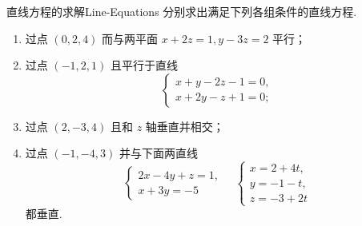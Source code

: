 \begin{problem}{直线方程的求解}{Line-Equations}
    分别求出满足下列各组条件的直线方程.
    \begin{enumerate}
        \item 过点 $(0, 2, 4)$ 而与两平面 $x + 2z = 1, y - 3z = 2$ 平行；
        \item 过点 $(-1, 2, 1)$ 且平行于直线
              \begin{equation*}
                  \begin{cases}
                      x + y - 2z - 1 = 0, \\
                      x + 2y - z + 1 = 0;
                  \end{cases}
              \end{equation*}
        \item 过点 $(2, -3, 4)$ 且和 $z$ 轴垂直并相交；
        \item 过点 $(-1, -4, 3)$ 并与下面两直线
              \begin{equation*}
                  \begin{cases}
                      2x - 4y + z = 1, \\
                      x + 3y = -5
                  \end{cases} \quad
                  \begin{cases}
                      x = 2 + 4t, \\
                      y = -1 - t, \\
                      z = -3 + 2t
                  \end{cases}
              \end{equation*}
              都垂直.
    \end{enumerate}
\end{problem}

